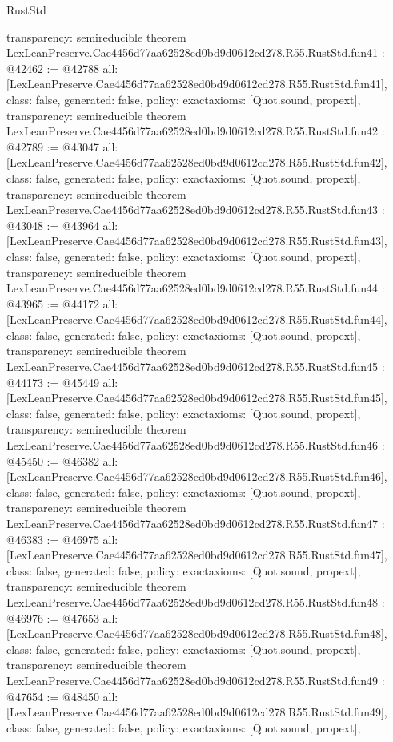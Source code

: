 \begin{lexlean}{RustStd}
\begin{coremodule}
{  transparency: semireducible
}
theorem LexLeanPreserve.Cae4456d77aa62528ed0bd9d0612cd278.R55.RustStd.fun41 : @42462 := @42788 {
  all: [LexLeanPreserve.Cae4456d77aa62528ed0bd9d0612cd278.R55.RustStd.fun41],
  class: false,
  generated: false,
  policy: exact{axioms: [Quot.sound, propext]},
  transparency: semireducible
}
theorem LexLeanPreserve.Cae4456d77aa62528ed0bd9d0612cd278.R55.RustStd.fun42 : @42789 := @43047 {
  all: [LexLeanPreserve.Cae4456d77aa62528ed0bd9d0612cd278.R55.RustStd.fun42],
  class: false,
  generated: false,
  policy: exact{axioms: [Quot.sound, propext]},
  transparency: semireducible
}
theorem LexLeanPreserve.Cae4456d77aa62528ed0bd9d0612cd278.R55.RustStd.fun43 : @43048 := @43964 {
  all: [LexLeanPreserve.Cae4456d77aa62528ed0bd9d0612cd278.R55.RustStd.fun43],
  class: false,
  generated: false,
  policy: exact{axioms: [Quot.sound, propext]},
  transparency: semireducible
}
theorem LexLeanPreserve.Cae4456d77aa62528ed0bd9d0612cd278.R55.RustStd.fun44 : @43965 := @44172 {
  all: [LexLeanPreserve.Cae4456d77aa62528ed0bd9d0612cd278.R55.RustStd.fun44],
  class: false,
  generated: false,
  policy: exact{axioms: [Quot.sound, propext]},
  transparency: semireducible
}
theorem LexLeanPreserve.Cae4456d77aa62528ed0bd9d0612cd278.R55.RustStd.fun45 : @44173 := @45449 {
  all: [LexLeanPreserve.Cae4456d77aa62528ed0bd9d0612cd278.R55.RustStd.fun45],
  class: false,
  generated: false,
  policy: exact{axioms: [Quot.sound, propext]},
  transparency: semireducible
}
theorem LexLeanPreserve.Cae4456d77aa62528ed0bd9d0612cd278.R55.RustStd.fun46 : @45450 := @46382 {
  all: [LexLeanPreserve.Cae4456d77aa62528ed0bd9d0612cd278.R55.RustStd.fun46],
  class: false,
  generated: false,
  policy: exact{axioms: [Quot.sound, propext]},
  transparency: semireducible
}
theorem LexLeanPreserve.Cae4456d77aa62528ed0bd9d0612cd278.R55.RustStd.fun47 : @46383 := @46975 {
  all: [LexLeanPreserve.Cae4456d77aa62528ed0bd9d0612cd278.R55.RustStd.fun47],
  class: false,
  generated: false,
  policy: exact{axioms: [Quot.sound, propext]},
  transparency: semireducible
}
theorem LexLeanPreserve.Cae4456d77aa62528ed0bd9d0612cd278.R55.RustStd.fun48 : @46976 := @47653 {
  all: [LexLeanPreserve.Cae4456d77aa62528ed0bd9d0612cd278.R55.RustStd.fun48],
  class: false,
  generated: false,
  policy: exact{axioms: [Quot.sound, propext]},
  transparency: semireducible
}
theorem LexLeanPreserve.Cae4456d77aa62528ed0bd9d0612cd278.R55.RustStd.fun49 : @47654 := @48450 {
  all: [LexLeanPreserve.Cae4456d77aa62528ed0bd9d0612cd278.R55.RustStd.fun49],
  class: false,
  generated: false,
  policy: exact{axioms: [Quot.sound, propext]},
}
\end{coremodule}
\end{lexlean}
